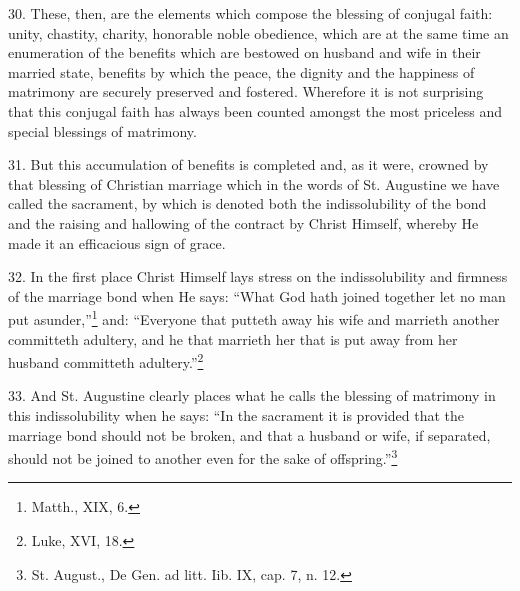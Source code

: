 \documentclass[12pt,a4paper]{book}
\begin{document}
30. These, then, are the elements which compose the blessing of conjugal faith: unity, chastity, charity, honorable noble obedience, which are at the same time an enumeration of the benefits which are bestowed on husband and wife in their married state, benefits by which the peace, the dignity and the happiness of matrimony are securely preserved and fostered. Wherefore it is not surprising that this conjugal faith has always been counted amongst the most priceless and special blessings of matrimony.

31. But this accumulation of benefits is completed and, as it were, crowned by that blessing of Christian marriage which in the words of St. Augustine we have called the sacrament, by which is denoted both the indissolubility of the bond and the raising and hallowing of the contract by Christ Himself, whereby He made it an efficacious sign of grace.

32. In the first place Christ Himself lays stress on the indissolubility and firmness of the marriage bond when He says: ``What God hath joined together let no man put asunder,''\footnote{Matth., XIX, 6.} and: ``Everyone that putteth away his wife and marrieth another committeth adultery, and he that marrieth her that is put away from her husband committeth adultery.''\footnote{Luke, XVI, 18.}

33. And St. Augustine clearly places what he calls the blessing of matrimony in this indissolubility when he says: ``In the sacrament it is provided that the marriage bond should not be broken, and that a husband or wife, if separated, should not be joined to another even for the sake of offspring.''\footnote{St. August., De Gen. ad litt. Iib. IX, cap. 7, n. 12.}
\end{document}
